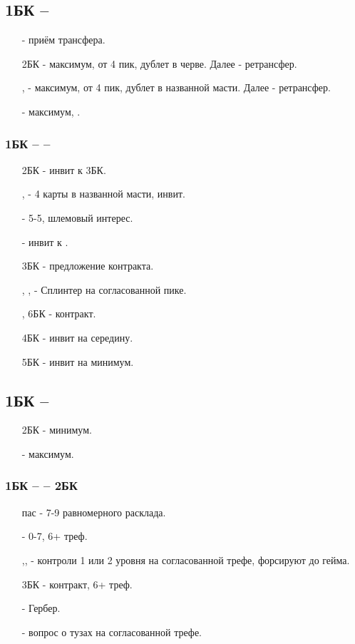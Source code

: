 \documentclass{article}
\begin{document}
\subsection{1БК -- }
\begin{enumerate}
    \item[\sp{2}] - приём трансфера.
    \item[2БК] - максимум, от 4 пик, дублет в черве. Далее  - ретрансфер.
    \item[\cl{3}, \di{3}] - максимум, от 4 пик, дублет в названной масти. Далее  - ретрансфер.
    \item[\sp{3}] - максимум, .
\end{enumerate}
\subsubsection{1БК --  -- }
\begin{enumerate}
    \item[2БК] - инвит к 3БК.
    \item[\cl{3}, \di{3}] - 4 карты в названной масти, инвит.
    \item[\he{3}] - 5-5, шлемовый интерес.
    \item[\sp{3}] - инвит к .
    \item[3БК] - предложение контракта.
    \item[\cl{4}, \di{4}, \he{4}] - Сплинтер на согласованной пике.
    \item[\sp{4}, 6БК] - контракт.
    \item[4БК] - инвит на середину.
    \item[5БК] - инвит на минимум.
\end{enumerate}
\subsection{1БК -- }
\begin{enumerate}
    \item[2БК] - минимум.
    \item[\cl{3}] - максимум.
\end{enumerate}
\subsubsection{1БК --  -- 2БК}
\begin{enumerate}
    \item[пас] - 7-9 равномерного расклада.
    \item[\cl{3}] - 0-7, 6+ треф.
    \item[\di{3},\he{3}, \sp{3}] - контроли 1 или 2 уровня на согласованной трефе, форсируют до гейма.
    \item[3БК] - контракт, 6+ треф.
    \item[\cl{4}] - Гербер.
    \item[\di{4}] - вопрос о тузах на согласованной трефе.
\end{enumerate}
\end{document}
